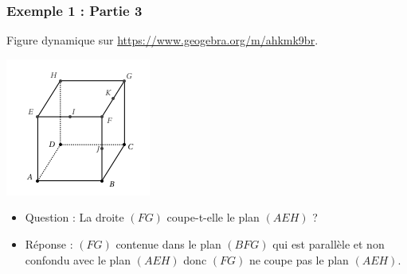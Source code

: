 \documentclass[xcolor=svgnames,t,final]{beamer}
\begin{document}
\begin{frame}

\frametitle{Exemple 1 : Partie 3}

Figure dynamique sur \href{https://www.geogebra.org/m/ahkmk9br}{https://www.geogebra.org/m/ahkmk9br}.


\begin{center}
\includegraphics[scale=0.4]{images/exemple1.png}
\end{center}

\begin{itemize}
\pause \item {\color{blue} Question : La droite $(FG)$ coupe-t-elle le plan $(AEH)$ ? }
\pause \item {\color{red} Réponse : %
$(FG)$ contenue dans le plan $(BFG)$ qui est parallèle et non confondu avec le plan $(AEH)$ donc $(FG)$ ne coupe pas le plan $(AEH)$.
}
\end{itemize}


\end{frame}
\end{document}
